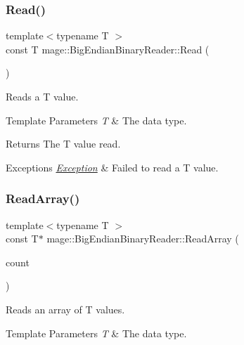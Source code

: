 \subsubsection{\texorpdfstring{Read()}{Read()}}
{\footnotesize\ttfamily template$<$typename T $>$ \\
const T mage\+::\+Big\+Endian\+Binary\+Reader\+::\+Read (\begin{DoxyParamCaption}{ }\end{DoxyParamCaption})\hspace{0.3cm}{\ttfamily [protected]}}

Reads a {\ttfamily T} value.


\begin{DoxyTemplParams}{Template Parameters}
{\em T} & The data type. \\
\hline
\end{DoxyTemplParams}
\begin{DoxyReturn}{Returns}
The {\ttfamily T} value read. 
\end{DoxyReturn}

\begin{DoxyExceptions}{Exceptions}
{\em \mbox{\hyperlink{classmage_1_1_exception}{Exception}}} & Failed to read a {\ttfamily T} value. \\
\hline
\end{DoxyExceptions}
\mbox{\label{classmage_1_1_big_endian_binary_reader_a3ec5205d485cdb31cc0d0fd338bfd4b6}} 
\subsubsection{\texorpdfstring{Read\+Array()}{ReadArray()}}
{\footnotesize\ttfamily template$<$typename T $>$ \\
const T$\ast$ mage\+::\+Big\+Endian\+Binary\+Reader\+::\+Read\+Array (\begin{DoxyParamCaption}\item[{std\+::size\+\_\+t}]{count }\end{DoxyParamCaption})\hspace{0.3cm}{\ttfamily [protected]}}

Reads an array of {\ttfamily T} values.


\begin{DoxyTemplParams}{Template Parameters}
{\em T} & The data type. \\
\hline
\end{DoxyTemplParams}

